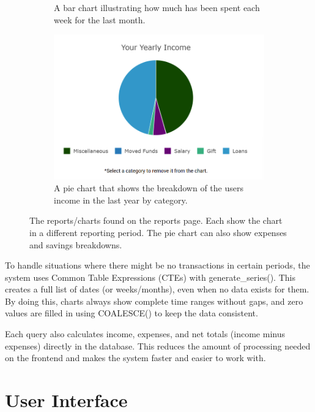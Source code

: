 \documentclass{l4proj}
\begin{document}
\begin{figure}[htb]
\begin{subfigure}[b]{0.3\textwidth}
        \caption{A bar chart illustrating how much has been spent each week for the last month.}
        \label{fig:bar-graph}
    \end{subfigure}
    \hspace{0.5em}
    \begin{subfigure}[b]{0.3\textwidth}
        \includegraphics[width=\textwidth]{images/UI-Screenshots/pie-chart.png}
        \caption{A pie chart that shows the breakdown of the users income in the last year by category.}
        \label{fig:pie-chart}
    \end{subfigure} 
    \caption{The reports/charts found on the reports page. Each show the chart in a different reporting period. The pie chart can also show expenses and savings breakdowns.}\label{fig:charts}
\end{figure}

To handle situations where there might be no transactions in certain periods, the system uses Common Table Expressions (CTEs) with generate\_series(). This creates a full list of dates (or weeks/months), even when no data exists for them. By doing this, charts always show complete time ranges without gaps, and zero values are filled in using COALESCE() to keep the data consistent.

Each query also calculates income, expenses, and net totals (income minus expenses) directly in the database. This reduces the amount of processing needed on the frontend and makes the system faster and easier to work with.

\section{User Interface}
\end{document}
